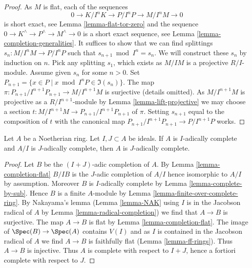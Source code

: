 \begin{proof}
As $M$ is flat, each of the sequences
$$
0 \to K/I^nK \to P/I^nP \to M/I^nM \to 0
$$
is short exact, see
Lemma \ref{lemma-flat-tor-zero}
and the sequence $0 \to K^\wedge \to P^\wedge \to M^\wedge \to 0$
is a short exact sequence, see
Lemma \ref{lemma-completion-generalities}.
It suffices to show that we can find splittings
$s_n : M/I^nM \to P/I^nP$ such that $s_{n + 1} \bmod I^n = s_n$.
We will construct these $s_n$ by induction on $n$.
Pick any splitting $s_1$, which exists as $M/IM$ is a projective $R/I$-module.
Assume given $s_n$ for some $n > 0$. Set
$P_{n + 1} = \{x \in P \mid x \bmod I^nP \in \Im(s_n)\}$.
The map $\pi : P_{n + 1}/I^{n + 1}P_{n + 1} \to M/I^{n + 1}M$ is surjective
(details omitted). As $M/I^{n + 1}M$ is projective as a $R/I^{n + 1}$-module
by
Lemma \ref{lemma-lift-projective}
we may choose a section
$t : M/I^{n + 1}M \to P_{n + 1}/I^{n + 1}P_{n + 1}$
of $\pi$. Setting $s_{n + 1}$ equal to the composition of
$t$ with the canonical map $P_{n + 1}/I^{n + 1}P_{n + 1} \to P/I^{n + 1}P$
works.
\end{proof}

\begin{lemma}
\label{lemma-complete-modulo-nilpotent}
Let $A$ be a Noetherian ring. Let $I, J \subset A$ be ideals.
If $A$ is $I$-adically complete and $A/I$ is $J$-adically complete,
then $A$ is $J$-adically complete.
\end{lemma}

\begin{proof}
Let $B$ be the $(I + J)$-adic completion of $A$. By
Lemma \ref{lemma-completion-flat} $B/IB$ is the $J$-adic completion of $A/I$
hence isomorphic to $A/I$ by assumption. Moreover $B$ is $I$-adically
complete by Lemma \ref{lemma-complete-by-sub}. Hence $B$ is a finite
$A$-module by Lemma \ref{lemma-finite-over-complete-ring}.
By Nakayama's lemma (Lemma \ref{lemma-NAK} using $I$ is in the
Jacobson radical of $A$
by Lemma \ref{lemma-radical-completion}) we find that $A \to B$ is surjective.
The map $A \to B$ is flat by Lemma \ref{lemma-completion-flat}.
The image of $\Spec(B) \to \Spec(A)$ contains $V(I)$ and as $I$
is contained in the Jacobson radical of $A$ we find $A \to B$ is faithfully flat
(Lemma \ref{lemma-ff-rings}). Thus $A \to B$ is injective. Thus $A$ is
complete with respect to $I + J$, hence a fortiori complete
with respect to $J$.
\end{proof}









